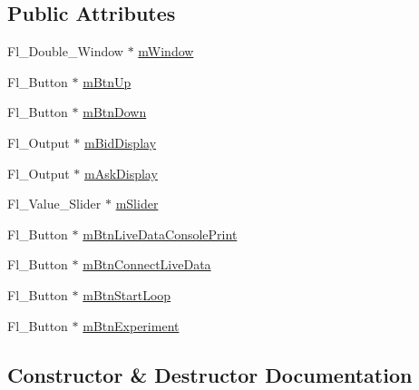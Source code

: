 \subsection*{Public Attributes}
\begin{DoxyCompactItemize}
\item 
Fl\+\_\+\+Double\+\_\+\+Window $\ast$ \hyperlink{class_fluid_price_control_u_i_ae46d2ef90d0168e432d81a4e8a3490ad}{m\+Window}
\item 
Fl\+\_\+\+Button $\ast$ \hyperlink{class_fluid_price_control_u_i_aad93e5aca9d51cb79bfcab447920725b}{m\+Btn\+Up}
\item 
Fl\+\_\+\+Button $\ast$ \hyperlink{class_fluid_price_control_u_i_ae37fe12e34d030760cdac07beb1bbd2a}{m\+Btn\+Down}
\item 
Fl\+\_\+\+Output $\ast$ \hyperlink{class_fluid_price_control_u_i_a2b2168f48d093610977ebf1f460efe45}{m\+Bid\+Display}
\item 
Fl\+\_\+\+Output $\ast$ \hyperlink{class_fluid_price_control_u_i_a362fe4e8d45b6ed293d519b53f5a59eb}{m\+Ask\+Display}
\item 
Fl\+\_\+\+Value\+\_\+\+Slider $\ast$ \hyperlink{class_fluid_price_control_u_i_a25682c8e7a2b560a980bf83f844f624d}{m\+Slider}
\item 
Fl\+\_\+\+Button $\ast$ \hyperlink{class_fluid_price_control_u_i_a7e10dcaefdec12b2baf2fb4bcee05caa}{m\+Btn\+Live\+Data\+Console\+Print}
\item 
Fl\+\_\+\+Button $\ast$ \hyperlink{class_fluid_price_control_u_i_a29d330db93240eadfec26e87d2dbe93b}{m\+Btn\+Connect\+Live\+Data}
\item 
Fl\+\_\+\+Button $\ast$ \hyperlink{class_fluid_price_control_u_i_ae447fa7404ef3619f800c7f9aabc0409}{m\+Btn\+Start\+Loop}
\item 
Fl\+\_\+\+Button $\ast$ \hyperlink{class_fluid_price_control_u_i_a84fec8b4e80c3c26ba1529882fb7f0d0}{m\+Btn\+Experiment}
\end{DoxyCompactItemize}


\subsection{Constructor \& Destructor Documentation}
\mbox{\label{class_fluid_price_control_u_i_a2cda3cd2bdafd0550ffd992166db9f9b}} 
